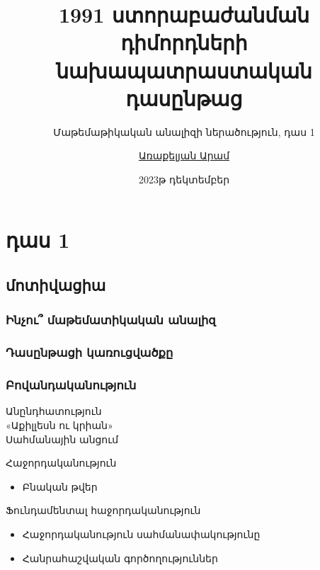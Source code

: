 \documentclass[aspectratio=169]{beamer} %
\title[մաթ․ անալիզ - դաս 1]{1991 ստորաբաժանման դիմորդների նախապատրաստական դասընթաց}
\subtitle{Մաթեմաթիկական անալիզի ներածություն, դաս 1}
\author[Առաքելյան Ա․]{
    \href{mailto:aram.arakeljan@gmail.com}{Առաքելյան Արամ}
}
\institute{\href{https://1991.mil.am/}{«1991» ակադեմիա}}
\date{2023թ դեկտեմբեր}
\begin{document}
    \begin{frame}
        \titlepage
    \end{frame}
     \section{դաս 1}
    \subsection{մոտիվացիա}
    \begin{frame}
        \frametitle{Ինչու՞ մաթեմատիկական անալիզ}
    \end{frame}
    \begin{frame}
        \frametitle{Դասընթացի կառուցվածքը}
    \end{frame}
    \begin{frame}
    \frametitle{Բովանդականություն}
    \begin{block}{}
        Անընդհատություն\\
        «Աքիլլեսն ու կրիան»\\
        Սահմանային անցում\\
    \end{block}
    \begin{block}{}
        Հաջորդականություն\\
        \begin{itemize}
            \item Բնական թվեր
        \end{itemize}
    \end{block}
    \begin{block}{}
        Ֆունդամենտալ հաջորդականություն\\
        \begin{itemize}
            \item Հաջորդականություն սահմանափակությունը
            \item Հանրահաշվական գործողություններ
        \end{itemize}
    \end{block}
    
    
    \end{frame}
\end{document}
